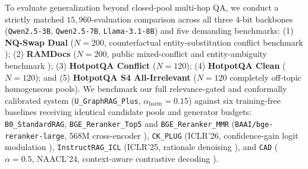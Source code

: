 \documentclass[11pt]{article}
\begin{document}
To evaluate generalization beyond closed-pool multi-hop QA, we conduct a strictly matched $15,960$-evaluation comparison across all three 4-bit backbones (\texttt{Qwen2.5-3B}, \texttt{Qwen2.5-7B}, \texttt{Llama-3.1-8B}) and five demanding benchmarks: (1) \textbf{NQ-Swap Dual} ($N=200$, counterfactual entity-substitution conflict benchmark \cite{longpre2021entity}); (2) \textbf{RAMDocs} ($N=200$, public mixed-conflict and entity-ambiguity benchmark \cite{wang2025madamrag}); (3) \textbf{HotpotQA Conflict} ($N=120$); (4) \textbf{HotpotQA Clean} ($N=120$); and (5) \textbf{HotpotQA S4 All-Irrelevant} ($N=120$ completely off-topic homogeneous pools). We benchmark our full relevance-gated and conformally calibrated system (\texttt{U\_GraphRAG\_Plus}, $\alpha_{\text{harm}}=0.15$) against six training-free baselines receiving identical candidate pools and generator budgets: \texttt{B0\_StandardRAG}, \texttt{BGE\_Reranker\_Top5} and \texttt{BGE\_Reranker\_MMR} (\texttt{BAAI/bge-reranker-large}, 568M cross-encoder \cite{chen2024bgem3}), \texttt{CK\_PLUG} (ICLR'26, confidence-gain logit modulation \cite{bi2026ckplug}), \texttt{InstructRAG\_ICL} (ICLR'25, rationale denoising \cite{wei2025instructrag}), and \texttt{CAD} ($\alpha=0.5$, NAACL'24, context-aware contrastive decoding \cite{shi2024cad}).
\end{document}
